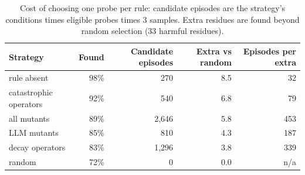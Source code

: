 \begin{table}[t]
\centering\small\setlength{\tabcolsep}{4pt}
\caption{Cost of choosing one probe per rule: candidate episodes are the strategy's conditions times eligible probes times 3 samples. Extra residues are found beyond random selection (33 harmful residues).}\label{tab:cost}
\begin{tabular}{lrrrr}
\toprule
Strategy & Found & Candidate episodes & Extra vs random & Episodes per extra \\
\midrule
rule absent & 98\% & 270 & 8.5 & 32 \\
catastrophic operators & 92\% & 540 & 6.8 & 79 \\
all mutants & 89\% & 2{,}646 & 5.8 & 453 \\
LLM mutants & 85\% & 810 & 4.3 & 187 \\
decay operators & 83\% & 1{,}296 & 3.8 & 339 \\
random & 72\% & 0 & 0.0 & n/a \\
\bottomrule
\end{tabular}
\end{table}
